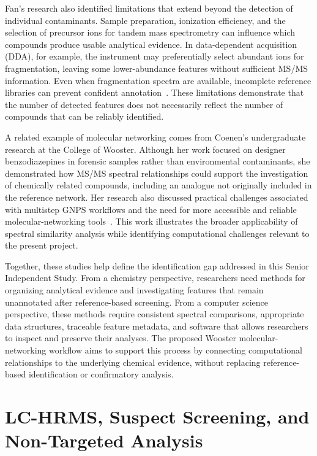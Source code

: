         Fan's research also identified limitations that extend beyond the detection of individual contaminants. Sample preparation, ionization efficiency, and the selection of precursor ions for tandem mass spectrometry can influence which compounds produce usable analytical evidence. In data-dependent acquisition (DDA), for example, the instrument may preferentially select abundant ions for fragmentation, leaving some lower-abundance features without sufficient MS/MS information. Even when fragmentation spectra are available, incomplete reference libraries can prevent confident annotation~\cite{Wenkai}. These limitations demonstrate that the number of detected features does not necessarily reflect the number of compounds that can be reliably identified.

        A related example of molecular networking comes from Coenen's undergraduate research at the College of Wooster. Although her work focused on designer benzodiazepines in forensic samples rather than environmental contaminants, she demonstrated how MS/MS spectral relationships could support the investigation of chemically related compounds, including an analogue not originally included in the reference network. Her research also discussed practical challenges associated with multistep GNPS workflows and the need for more accessible and reliable molecular-networking tools~\cite{Coenen2026}. This work illustrates the broader applicability of spectral similarity analysis while identifying computational challenges relevant to the present project.

        Together, these studies help define the identification gap addressed in this Senior Independent Study. From a chemistry perspective, researchers need methods for organizing analytical evidence and investigating features that remain unannotated after reference-based screening. From a computer science perspective, these methods require consistent spectral comparisons, appropriate data structures, traceable feature metadata, and software that allows researchers to inspect and preserve their analyses. The proposed Wooster molecular-networking workflow aims to support this process by connecting computational relationships to the underlying chemical evidence, without replacing reference-based identification or confirmatory analysis.


\section{LC-HRMS, Suspect Screening, and Non-Targeted Analysis}\label{sec:lc-hrms}

